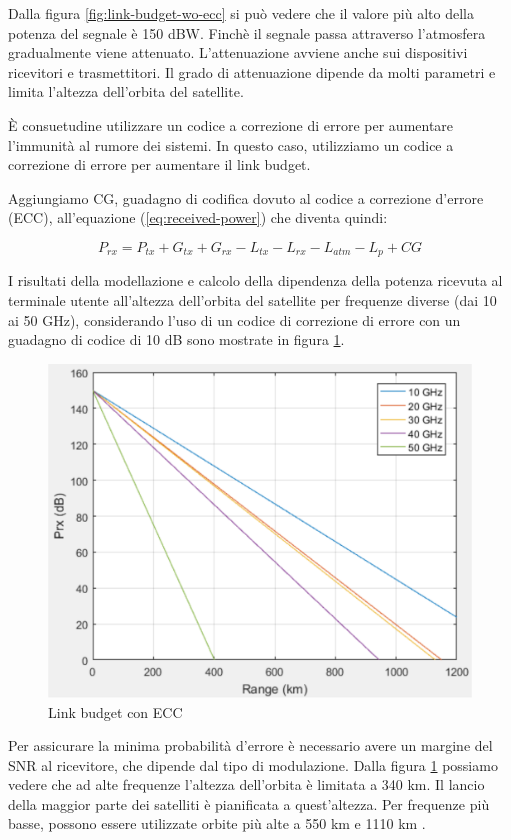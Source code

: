 Dalla figura \ref{fig:link-budget-wo-ecc} si può vedere che il valore più alto della potenza del segnale è 150 dBW.
Finchè il segnale passa attraverso l'atmosfera gradualmente viene attenuato.
L'attenuazione avviene anche sui dispositivi ricevitori e trasmettitori.
Il grado di attenuazione dipende da molti parametri e limita l'altezza dell'orbita del satellite.

È consuetudine utilizzare un codice a correzione di errore per aumentare l'immunità al rumore dei sistemi.
In questo caso, utilizziamo un codice a correzione di errore per aumentare il link budget.

Aggiungiamo CG, guadagno di codifica dovuto al codice a correzione d'errore (\ac{ECC}), all'equazione (\ref{eq:received-power}) che diventa quindi:

\begin{equation}
  P_{rx} = P_{tx} + G_{tx} + G_{rx} - L_{tx} - L_{rx} - L_{atm} - L_{p} + CG
\end{equation}

I risultati della modellazione e calcolo della dipendenza della potenza ricevuta al terminale utente all'altezza dell'orbita del satellite per frequenze diverse (dai 10 ai 50 GHz), considerando l'uso di un codice di correzione di errore con un guadagno di codice di 10 dB sono mostrate in figura \ref{fig:link-budget-w-ecc}.

\begin{figure}[htbp]
  \centering
  \includegraphics[width=0.8\linewidth]{./res/img/link_budget_w_ecc.png}
  \caption{Link budget con \ac{ECC}}
  \label{fig:link-budget-w-ecc}
\end{figure}

Per assicurare la minima probabilità d'errore è necessario avere un margine del \ac{SNR} al ricevitore, che dipende dal tipo di modulazione.
Dalla figura \ref{fig:link-budget-w-ecc} possiamo vedere che ad alte frequenze l'altezza dell'orbita è limitata a 340 km.
Il lancio della maggior parte dei satelliti è pianificata a quest'altezza.
Per frequenze più basse, possono essere utilizzate orbite più alte a 550 km e 1110 km \cite{rozenvasser_estimation_2023}.

